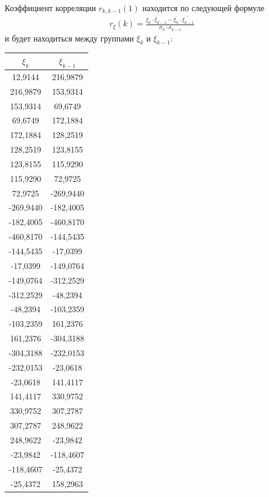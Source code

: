 \documentclass[utf8, a4paper, 14pt, russian, oneside]{book}
\begin{document}
Коэффициент корреляции $r_{k, k-1}(1)$ находится по следующей формуле
\begin{gather*}
    r_\xi(k) = \frac{
        \overline{\xi_k \cdot \xi_{k-1}} - \overline{\xi_k} \cdot \overline{\xi_{k-1}}
    }{
        \sigma_k \cdot \sigma_{k-1}
    }
\end{gather*}
и будет находиться между группами  $\xi_k$ и $\xi_{k-1}$:
\begin{table}[h!]
    \centering
    \begin{tabular}{|c|c|}
        \hline
        $\xi_k$ & $\xi_{k-1}$ \\ \hline
        12,9144   & 216,9879  \\ \hline
        216,9879  & 153,9314  \\ \hline
        153,9314  & 69,6749   \\ \hline
        69,6749   & 172,1884  \\ \hline
        172,1884  & 128,2519  \\ \hline
        128,2519  & 123,8155  \\ \hline
        123,8155  & 115,9290  \\ \hline
        115,9290  & 72,9725   \\ \hline
        72,9725   & -269,9440 \\ \hline
        -269,9440 & -182,4005 \\ \hline
        -182,4005 & -460,8170 \\ \hline
        -460,8170 & -144,5435 \\ \hline
        -144,5435 & -17,0399  \\ \hline
        -17,0399  & -149,0764 \\ \hline
        -149,0764 & -312,2529 \\ \hline
        -312,2529 & -48,2394  \\ \hline
        -48,2394  & -103,2359 \\ \hline
        -103,2359 & 161,2376  \\ \hline
        161,2376  & -304,3188 \\ \hline
        -304,3188 & -232,0153 \\ \hline
        -232,0153 & -23,0618  \\ \hline
        -23,0618  & 141,4117  \\ \hline
        141,4117  & 330,9752  \\ \hline
        330,9752  & 307,2787  \\ \hline
        307,2787  & 248,9622  \\ \hline
        248,9622  & -23,9842  \\ \hline
        -23,9842  & -118,4607 \\ \hline
        -118,4607 & -25,4372  \\ \hline
        -25,4372  & 158,2963  \\ \hline
    \end{tabular}
\end{table}
\end{document}
